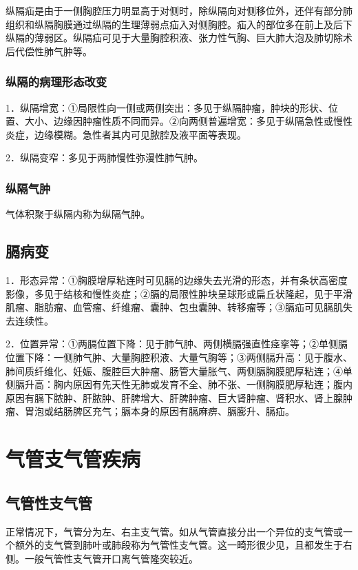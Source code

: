纵隔疝是由于一侧胸腔压力明显高于对侧时，除纵隔向对侧移位外，还伴有部分肺组织和纵隔胸膜通过纵隔的生理薄弱点疝入对侧胸腔。疝入的部位多在前上及后下纵隔的薄弱区。纵隔疝可见于大量胸腔积液、张力性气胸、巨大肺大泡及肺切除术后代偿性肺气肿等。

\subsubsection{纵隔的病理形态改变}

1．纵隔增宽：①局限性向一侧或两侧突出：多见于纵隔肿瘤，肿块的形状、位置、大小、边缘因肿瘤性质不同而异。②向两侧普遍增宽：多见于纵隔急性或慢性炎症，边缘模糊。急性者其内可见脓腔及液平面等表现。

2．纵隔变窄：多见于两肺慢性弥漫性肺气肿。

\subsubsection{纵隔气肿}

气体积聚于纵隔内称为纵隔气肿。

\subsection{膈病变}

1．形态异常：①胸膜增厚粘连时可见膈的边缘失去光滑的形态，并有条状高密度影像，多见于结核和慢性炎症；②膈的局限性肿块呈球形或扁丘状隆起，见于平滑肌瘤、脂肪瘤、血管瘤、纤维瘤、囊肿、包虫囊肿、转移瘤等；③膈疝可见膈肌失去连续性。

2．位置异常：①两膈位置下降：见于肺气肿、两侧横膈强直性痉挛等；②单侧膈位置下降：一侧肺气肿、大量胸腔积液、大量气胸等；③两侧膈升高：见于腹水、肺间质纤维化、妊娠、腹腔巨大肿瘤、肠管大量胀气、两侧膈胸膜肥厚粘连；④单侧膈升高：胸内原因有先天性无肺或发育不全、肺不张、一侧胸膜肥厚粘连；腹内原因有膈下脓肿、肝脓肿、肝脾增大、肝脾肿瘤、巨大肾肿瘤、肾积水、肾上腺肿瘤、胃泡或结肠脾区充气；膈本身的原因有膈麻痹、膈膨升、膈疝。

\section{气管支气管疾病}

\subsection{气管性支气管}

正常情况下，气管分为左、右主支气管。如从气管直接分出一个异位的支气管或一个额外的支气管到肺叶或肺段称为气管性支气管。这一畸形很少见，且都发生于右侧。一般气管性支气管开口离气管隆突较近。

